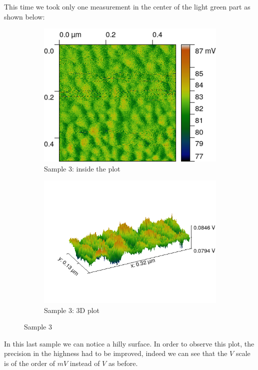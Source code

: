 \documentclass[11pt,a4paper]{article}
\begin{document}
This time we took only one measurement in the center of the light green part as shown below:
\begin{figure}[H]
\centering
\begin{subfigure}[b]{0.45\textwidth}
\includegraphics[width=\textwidth]{sm_sample3}
\caption{Sample 3: inside the plot}
\label{fig:}
\end{subfigure}
\begin{subfigure}[b]{0.45\textwidth}
\includegraphics[width=\textwidth]{sm_sample3_3D_improved}
\caption{Sample 3: 3D plot}
\label{fig:}
\end{subfigure}
\caption{Sample 3}
\end{figure}
In this last sample we can notice a hilly surface. In order to observe this plot, the precision in the highness had to be improved, indeed we can see that the $V$ scale is of the order of $mV$ instead of $V$ as before.
\end{document}
